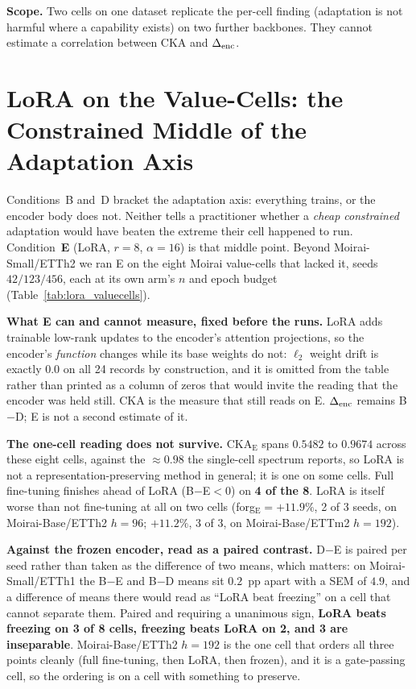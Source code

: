 \textbf{Scope.}  Two cells on one dataset replicate the per-cell finding (adaptation
is not harmful where a capability exists) on two further backbones.  They cannot
estimate a correlation between CKA and $\Delta_\text{enc}$.

\section{LoRA on the Value-Cells: the Constrained Middle of the Adaptation Axis}
\label{app:loravaluecells}

Conditions~B and~D bracket the adaptation axis: everything trains, or the
encoder body does not. Neither tells a practitioner whether a \emph{cheap
constrained} adaptation would have beaten the extreme their cell happened to
run. Condition~\textbf{E} (LoRA, $r{=}8$, $\alpha{=}16$) is that middle point.
Beyond Moirai-Small/ETTh2 we ran E on the eight Moirai value-cells that lacked it,
seeds $42/123/456$, each at its own arm's $n$ and epoch budget
(Table~\ref{tab:lora_valuecells}).

\textbf{What E can and cannot measure, fixed before the runs.} LoRA adds
trainable low-rank updates to the encoder's attention projections, so the
encoder's \emph{function} changes while its base weights do not: $\ell_2$ weight
drift is exactly $0.0$ on all 24 records by construction, and it is omitted from
the table rather than printed as a column of zeros that would invite the reading
that the encoder was held still. CKA is the measure that still reads on E. $\Delta_\text{enc}$
remains B$-$D; E is not a second estimate of it.

\textbf{The one-cell reading does not survive.} CKA$_\text{E}$ spans
$0.5482$ to $0.9674$ across these eight cells, against the ${\approx}0.98$ the
single-cell spectrum reports, so LoRA is not a representation-preserving method
in general; it is one on some cells. Full fine-tuning finishes ahead of LoRA
(B$-$E${}<0$) on \textbf{4 of the 8}. LoRA is itself worse than not fine-tuning
at all on two cells (forg$_\text{E}={+}11.9\%$, 2 of 3 seeds, on
Moirai-Base/ETTh2 $h{=}96$; ${+}11.2\%$, 3 of 3, on Moirai-Base/ETTm2
$h{=}192$).

\textbf{Against the frozen encoder, read as a paired contrast.} D$-$E is paired
per seed rather than taken as the difference of two means, which matters: on
Moirai-Small/ETTh1 the B$-$E and B$-$D means sit $0.2$~pp apart with a SEM of
$4.9$, and a difference of means there would read as ``LoRA beat freezing'' on
a cell that cannot separate them. Paired and requiring a unanimous sign,
\textbf{LoRA beats freezing on 3 of 8 cells, freezing beats LoRA on 2, and 3 are
inseparable}. Moirai-Base/ETTh2 $h{=}192$ is the one cell that orders all three
points cleanly (full fine-tuning, then LoRA, then frozen), and it is a
gate-passing cell, so the ordering is on a cell with something to preserve.

